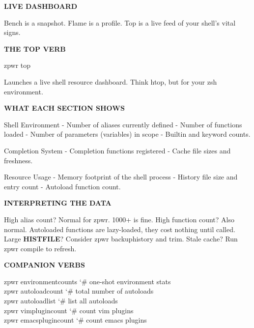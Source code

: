 \documentclass[11pt,a4paper,twoside]{book}
\begin{document}
\vspace{10pt}
{\large\bfseries\color{neoncyan} LIVE DASHBOARD}\vspace{6pt}

Bench is a snapshot. Flame is a profile. Top is a live feed of your shell's vital signs.


\vspace{12pt}
{\bfseries\color{neonyellow} THE TOP VERB}\vspace{4pt}

\begin{codebox}
\color{neongreen}zpwr top\\
\end{codebox}

Launches a live shell resource dashboard. Think htop, but for your zsh environment.


\vspace{12pt}
{\bfseries\color{neonyellow} WHAT EACH SECTION SHOWS}\vspace{4pt}

Shell Environment - Number of aliases currently defined - Number of functions loaded - Number of parameters (variables) in scope - Builtin and keyword counts.

Completion System - Completion functions registered - Cache file sizes and freshness.

Resource Usage - Memory footprint of the shell process - History file size and entry count - Autoload function count.


\vspace{12pt}
{\bfseries\color{neonyellow} INTERPRETING THE DATA}\vspace{4pt}

High alias count?    Normal for zpwr. 1000+ is fine. High function count? Also normal. Autoloaded functions are lazy-loaded, they cost nothing until called. Large \textbf{HISTFILE}?      Consider zpwr backuphistory and trim. Stale cache?         Run zpwr compile to refresh.


\vspace{12pt}
{\bfseries\color{neonyellow} COMPANION VERBS}\vspace{4pt}

\begin{codebox}
\color{neongreen}zpwr environmentcounts   {\char`\#} one-shot environment stats\\
\color{neongreen}zpwr autoloadcount       {\char`\#} total number of autoloads\\
\color{neongreen}zpwr autoloadlist        {\char`\#} list all autoloads\\
\color{neongreen}zpwr vimplugincount      {\char`\#} count vim plugins\\
\color{neongreen}zpwr emacsplugincount    {\char`\#} count emacs plugins\\
\end{codebox}
\end{document}
